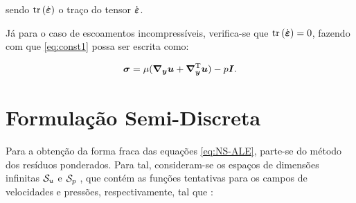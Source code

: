 \noindent sendo $\mathop{\mathrm{tr}}\nolimits{(\dot{\boldsymbol{\varepsilon}})}$ o traço do tensor $\dot{\boldsymbol{\varepsilon}}$.

Já para o caso de escoamentos incompressíveis, verifica-se que $\mathop{\mathrm{tr}}\nolimits{(\dot{\boldsymbol{\varepsilon}})}=0$, fazendo com que \eqref{eq:const1} possa ser escrita como:

\begin{equation}
    \boldsymbol{\sigma}=\mu(\boldsymbol{\nabla_y}\boldsymbol{u}+\boldsymbol{\nabla}^{\mathrm{T}}_{\boldsymbol{y}}\boldsymbol{u})-p\boldsymbol{I}\text{.}\label{eq:ModConst}
\end{equation}

% 
% 

\section{Formulação Semi-Discreta} \label{FSD}

Para a obtenção da forma fraca das equações \eqref{eq:NS-ALE}, parte-se do método dos resíduos ponderados. Para tal, consideram-se os espaços de dimensões infinitas $\mathcal{S}_u$ e $\mathcal{S}_p$ , que contém as funções tentativas para os campos de velocidades e pressões, respectivamente, tal que \cite{bazilevs2013computational,fernandes2020tecnica}:

